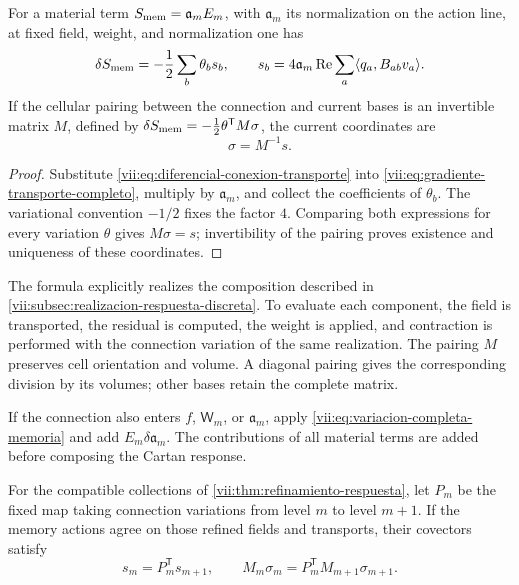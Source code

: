 \begin{theorem}
\label{vii:thm:corriente-conexion-evaluada}
For a material term \(S_{\rm mem}=\mathfrak a_m E_m\),
with \(\mathfrak a_m\) its normalization on the action line,
at fixed field, weight, and normalization one has
\begin{equation}
 \delta S_{\rm mem}=-\frac12\sum_b\theta_b s_b,\qquad
 s_b=4\mathfrak a_m\operatorname{Re}
        \sum_a\langle q_a,B_{ab}v_a\rangle.
 \label{vii:eq:componentes-corriente-conexion}
\end{equation}
If the cellular pairing between the connection and current bases
is an invertible matrix \(M\), defined by
\(\delta S_{\rm mem}=-\tfrac12\theta^{\mathsf T}M\sigma\),
the current coordinates are
\begin{equation}
 \sigma=M^{-1}s.
 \label{vii:eq:coordenadas-corriente-material}
\end{equation}
\end{theorem}

\begin{proof}
Substitute \eqref{vii:eq:diferencial-conexion-transporte} into
\eqref{vii:eq:gradiente-transporte-completo}, multiply by
\(\mathfrak a_m\), and collect the coefficients of
\(\theta_b\). The variational convention \(-1/2\) fixes the
factor \(4\). Comparing both expressions for every variation
\(\theta\) gives \(M\sigma=s\); invertibility of the
pairing proves existence and uniqueness of these coordinates.
\end{proof}

The formula explicitly realizes the composition described in
\ref{vii:subsec:realizacion-respuesta-discreta}. To evaluate each
component, the field is transported, the residual is computed, the
weight is applied, and contraction is performed with the connection variation
of the same realization. The pairing \(M\) preserves cell orientation and volume.
A diagonal pairing gives the corresponding division by its
volumes; other bases retain the complete matrix.

If the connection also enters \(f\), \(\mathsf W_m\),
or \(\mathfrak a_m\), apply
\eqref{vii:eq:variacion-completa-memoria} and add
\(E_m\delta\mathfrak a_m\). The contributions of all
material terms are added before composing the Cartan response.

\begin{corollary}
\label{vii:cor:refinamiento-corriente-conexion}
For the compatible collections of
\ref{vii:thm:refinamiento-respuesta}, let \(P_m\) be the fixed map
taking connection variations from level \(m\) to level
\(m+1\). If the memory actions agree on those refined fields
and transports, their covectors satisfy
\[
 s_m=P_m^{\mathsf T}s_{m+1},\qquad
 M_m\sigma_m=P_m^{\mathsf T}M_{m+1}\sigma_{m+1}.
\]
\end{corollary}

